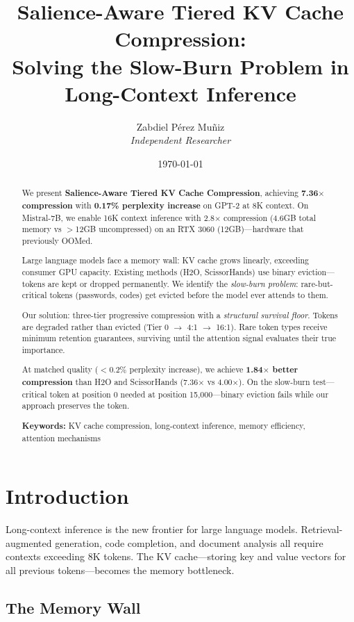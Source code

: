 \documentclass[11pt]{article}
\title{Salience-Aware Tiered KV Cache Compression: \\ Solving the Slow-Burn Problem in Long-Context Inference}
\author{Zabdiel Pérez Muñiz \\\textit{Independent Researcher}}
\date{\today}
\begin{document}
\maketitle

\begin{abstract}
We present \textbf{Salience-Aware Tiered KV Cache Compression}, achieving \textbf{7.36$\times$ compression} with \textbf{0.17\% perplexity increase} on GPT-2 at 8K context. On Mistral-7B, we enable 16K context inference with 2.8$\times$ compression (4.6GB total memory vs $>$12GB uncompressed) on an RTX 3060 (12GB)---hardware that previously OOMed.

Large language models face a memory wall: KV cache grows linearly, exceeding consumer GPU capacity. Existing methods (H2O, ScissorHands) use binary eviction---tokens are kept or dropped permanently. We identify the \textit{slow-burn problem}: rare-but-critical tokens (passwords, codes) get evicted before the model ever attends to them.

Our solution: three-tier progressive compression with a \textit{structural survival floor}. Tokens are degraded rather than evicted (Tier 0 $\rightarrow$ 4:1 $\rightarrow$ 16:1). Rare token types receive minimum retention guarantees, surviving until the attention signal evaluates their true importance.

At matched quality ($<$0.2\% perplexity increase), we achieve \textbf{1.84$\times$ better compression} than H2O and ScissorHands (7.36$\times$ vs 4.00$\times$). On the slow-burn test---critical token at position 0 needed at position 15,000---binary eviction fails while our approach preserves the token.

\textbf{Keywords:} KV cache compression, long-context inference, memory efficiency, attention mechanisms
\end{abstract}

\section{Introduction}

Long-context inference is the new frontier for large language models. Retrieval-augmented generation, code completion, and document analysis all require contexts exceeding 8K tokens. The KV cache---storing key and value vectors for all previous tokens---becomes the memory bottleneck.

\subsection{The Memory Wall}
\end{document}
